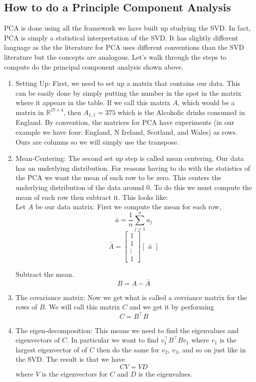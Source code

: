 \documentclass{article}
\begin{document}
\subsection{How to do a Principle Component Analysis}
PCA is done using all the framework we have built up studying the SVD. In fact, PCA is simply a statistical interpretation of the SVD. It has slightly different language as the the literature for PCA uses different conventions than the SVD literature but the concepts are analogous. Let's walk through the steps to compute do the principal component analysis shown above.
\bigskip

\begin{enumerate}
\item Setting Up: First, we need to set up a matrix that contains our data. This can be easily done by simply putting the number in the spot in the matrix where it appears in the table. If we call this matrix $A$, which would be a matrix in $\mathbb{R}^{17\times 4}$, then $A_{1,1}=375$ which is the Alcoholic drinks consumed in England. By convention, the matrices for PCA have experiments (in our example we have four: England, N Ireland, Scotland, and Wales) as rows. Ours are columns so we will simply use the transpose.

\item Mean-Centering: The second set up step is called mean centering. Our data has an underlying distribution. For reasons having to do with the statistics of the PCA we want the mean of each row to be zero. This centers the underlying distribution of the data around 0. To do this we must compute the mean of each row then subtract it. This looks like:
$$~$$
Let $A$ be our data matrix. First we compute the mean for each row,
$$\bar{a}=\frac{1}{n}\sum_{j=1}^n a_j$$
$$\bar{A}=\begin{bmatrix}1\\1\\\vdots\\1\end{bmatrix}\left[~\,\bar{a}\,~\right]$$

Subtract the mean.
$$B=A-\bar{A}$$

\item The covariance matrix: Now we get what is called a covriance matrix for the rows of $B$. We will call this matrix $C$ and we get it by performing
$$C=B^\top B$$

\item The eigen-decomposition: This means we need to find the eigenvalues and eigenvectors of $C$. In particular we want to find $v_1^\top B^\top B v_1$ where $v_1$ is the largest eigenvector of of $C$ then do the same for $v_2$, $v_3$, and so on just like in the SVD. The result is that we have $$CV=VD$$ where $V$ is the eigenvectors for $C$ and $D$ is the eigenvalues.


\end{enumerate}
\end{document}
